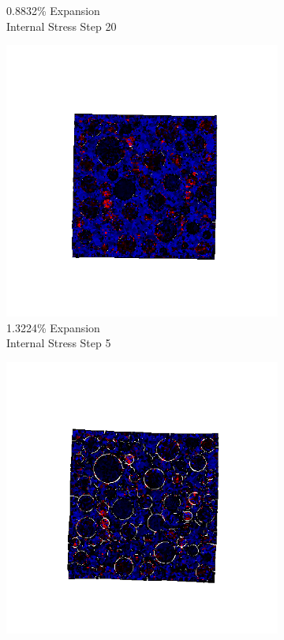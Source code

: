 \begin{figure}[ht!]
\begin{subfigure}{.25\textwidth}
      \caption{0.8832\% Expansion\\Internal Stress Step 20}
    \end{subfigure}

    \begin{subfigure}{.25\textwidth}
      \centering
      \includegraphics[width=1.0\linewidth]{Files/exp_3D/ASR/A30P75_5_s5.png}
      \caption{1.3224\% Expansion\\Internal Stress Step 5}
    \end{subfigure}%
    \begin{subfigure}{.25\textwidth}
      \centering
      \includegraphics[width=1.0\linewidth]{Files/exp_3D/ASR/A30P75_5_s10.png}

\end{subfigure}
\end{figure}
